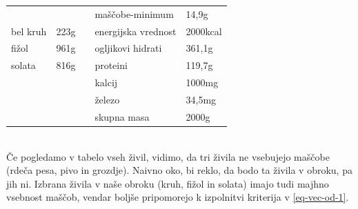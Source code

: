 \documentclass[slovene,11pt,a4paper]{article}
\numberwithin{equation}{section} %
\numberwithin{figure}{section} %
\numberwithin{table}{section} %
\begin{document}
\begin{table}[!h]
\centering
\begin{tabular}{lll|l|l|}
\cline{4-5}
                               &                           &  & maščobe-minimum     & 14,9g  \\ \cline{1-2} \cline{4-5} 
\multicolumn{1}{|l|}{bel kruh} & \multicolumn{1}{l|}{223g} &  & energijska vrednost & 2000kcal \\ \cline{1-2} \cline{4-5} 
\multicolumn{1}{|l|}{fižol}    & \multicolumn{1}{l|}{961g} &  & ogljikovi hidrati   & 361,1g   \\ \cline{1-2} \cline{4-5} 
\multicolumn{1}{|l|}{solata}   & \multicolumn{1}{l|}{816g} &  & proteini            & 119,7g   \\ \cline{1-2} \cline{4-5} 
                               &                           &  & kalcij              & 1000mg   \\ \cline{4-5} 
                               &                           &  & železo              & 34,5mg   \\ \cline{4-5} 
                               &                           &  & skupna masa         & 2000g    \\ \cline{4-5} 
\end{tabular}
\end{table}
\\
Če pogledamo v tabelo vseh živil, vidimo, da tri živila ne vsebujejo maščobe (rdeča pesa, pivo in grozdje). Naivno oko, bi reklo, da bodo ta živila v obroku, pa jih ni. Izbrana živila v naše obroku (kruh, fižol in solata) imajo tudi majhno vsebnost maščob, vendar boljše pripomorejo k izpolnitvi kriterija v \ref{eq-vec-od-1}.
\end{document}
